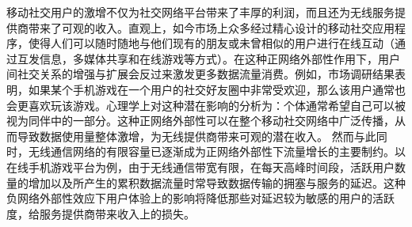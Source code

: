 移动社交用户的激增不仅为社交网络平台带来了丰厚的利润，而且还为无线服务提供商带来了可观的收入。直观上，如今市场上众多经过精心设计的移动社交应用程序，使得人们可以随时随地与他们现有的朋友或未曾相似的用户进行在线互动（通过互发信息，多媒体共享和在线游戏等方式）。在这种{\kaishu 正网络外部性}作用\cite{David10}下，用户间社交关系的增强与扩展会反过来激发更多数据流量消费。例如，市场调研结果表明，如果某个手机游戏在一个用户的社交好友圈中非常受欢迎，那么该用户通常也会更喜欢玩该游戏。心理学上对这种潜在影响的分析为：个体通常希望自己可以被视为同伴中的一部分。这种正网络外部性可以在整个移动社交网络中广泛传播，从而导致数据使用量整体激增，为无线提供商带来可观的潜在收入。
然而与此同时，无线通信网络的有限容量已逐渐成为正网络外部性下流量增长的主要制约。以在线手机游戏平台为例，由于无线通信带宽有限，在每天高峰时间段，活跃用户数量的增加以及所产生的累积数据流量时常导致数据传输的拥塞与服务的延迟。这种{\kaishu 负网络外部性}效应下用户体验上的影响将降低那些对延迟较为敏感的用户的活跃度，给服务提供商带来收入上的损失。

